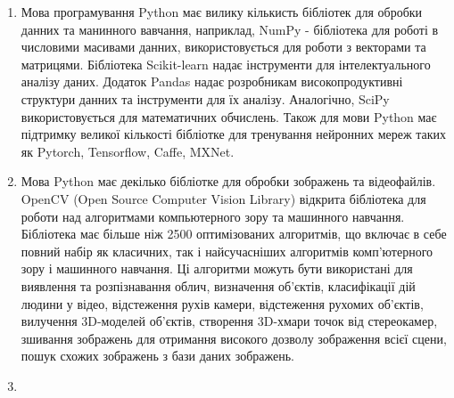 \begin{enumerate}
\item Мова програмування Python має вилику кількисть бібліотек для обробки данних та манинного вавчання, наприклад, NumPy - бібліотека для роботі в числовими масивами данних, використовується для роботи з векторами та матрицями. Бібліотека Scikit-learn надає інструменти для інтелектуального аналізу даних. Додаток Pandas надає розробникам високопродуктивні структури данних та інструменти для їх аналізу. Аналогічно, SciPy використовується для математичних обчислень. Також для мови Python має підтримку великої кількості бібліотке для тренування нейронних мереж таких як Pytorch, Tensorflow, Caffe, MXNet.
\item Мова Python має декілько бібліотке для обробки зображень та відеофайлів. OpenCV (Open Source Computer Vision Library) відкрита бібліотека для роботи над алгоритмами компьютерного зору та машинного навчання. Бібліотека має більше ніж 2500 оптимізованих алгоритмів, що включає в себе повний набір як класичних, так і найсучасніших алгоритмів комп'ютерного зору і машинного навчання. Ці алгоритми можуть бути використані для виявлення та розпізнавання облич, визначення об'єктів, класифікації дій людини у відео, відстеження рухів камери, відстеження рухомих об'єктів, вилучення 3D-моделей об'єктів, створення 3D-хмари точок від стереокамер, зшивання зображень для отримання високого дозволу зображення всієї сцени, пошук схожих зображень з бази даних зображень.
\item 
\end{enumerate}







